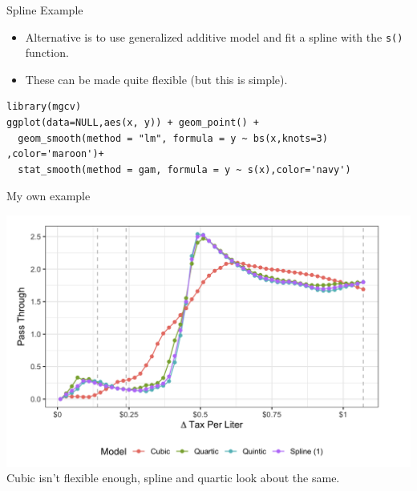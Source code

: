 \documentclass[11pt,handout,xcolor=pdftex,dvipsnames,table,mathserif,aspectratio=169]{beamer}
\begin{document}
\begin{frame}[fragile]{Spline Example}
\begin{itemize}
\item Alternative is to use \alert{generalized additive model} and fit a spline with the \texttt{s()} function.
\item These can be made quite flexible (but this is simple).
\end{itemize}
 \tiny
\begin{verbatim}
library(mgcv)
ggplot(data=NULL,aes(x, y)) + geom_point() + 
  geom_smooth(method = "lm", formula = y ~ bs(x,knots=3) ,color='maroon')+
  stat_smooth(method = gam, formula = y ~ s(x),color='navy')
\end{verbatim}
\end{frame}


  
  
\begin{frame}{My own example}
\begin{center}
\includegraphics[height=0.8\textheight]{./resources/ptr.png}\\
Cubic isn't flexible enough, spline and quartic look about the same.
\end{center}
\end{frame}
\end{document}
